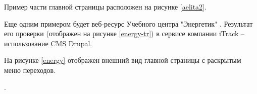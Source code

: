 
Пример части главной страницы расположен на рисунке \ref{aelita2}.


Еще одним примером будет веб-ресурс Учебного центра "Энергетик" \cite{energy}.
Результат его проверки (отображен на рисунке \ref{energy-tr}) в сервисе компании iTrack -- использование CMS Drupal.


На рисунке \ref{energy} отображен внешний вид главной страницы с раскрытым меню переходов.

.


\clearpage
